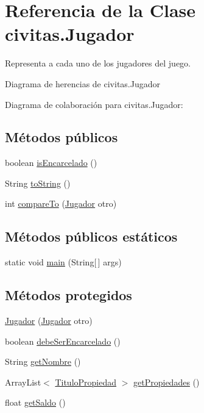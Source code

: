 \hypertarget{classcivitas_1_1Jugador}{}\section{Referencia de la Clase civitas.\+Jugador}
\label{classcivitas_1_1Jugador}


Representa a cada uno de los jugadores del juego.  




Diagrama de herencias de civitas.\+Jugador


Diagrama de colaboración para civitas.\+Jugador\+:
\subsection*{Métodos públicos}
\begin{DoxyCompactItemize}
\item 
boolean \hyperlink{classcivitas_1_1Jugador_a05547894205ba819363c25f40addecae}{is\+Encarcelado} ()
\item 
String \hyperlink{classcivitas_1_1Jugador_a102b4070dfc271c865fcd6ebe92d9c06}{to\+String} ()
\item 
int \hyperlink{classcivitas_1_1Jugador_ad18fdf2b46d7146b458a77a919d66b58}{compare\+To} (\hyperlink{classcivitas_1_1Jugador}{Jugador} otro)
\end{DoxyCompactItemize}
\subsection*{Métodos públicos estáticos}
\begin{DoxyCompactItemize}
\item 
static void \hyperlink{classcivitas_1_1Jugador_a5ffd1393041fb0afa52d8d4a9572cdf2}{main} (String\mbox{[}$\,$\mbox{]} args)
\end{DoxyCompactItemize}
\subsection*{Métodos protegidos}
\begin{DoxyCompactItemize}
\item 
\hyperlink{classcivitas_1_1Jugador_ab6d7fb12843896b100653b7ad9d9bab8}{Jugador} (\hyperlink{classcivitas_1_1Jugador}{Jugador} otro)
\item 
boolean \hyperlink{classcivitas_1_1Jugador_af79b45017fa40c343ea072a30e9578d4}{debe\+Ser\+Encarcelado} ()
\item 
String \hyperlink{classcivitas_1_1Jugador_a798c1fffaaf1dd8d12f36dd3d09b4f1b}{get\+Nombre} ()
\item 
Array\+List$<$ \hyperlink{classcivitas_1_1TituloPropiedad}{Titulo\+Propiedad} $>$ \hyperlink{classcivitas_1_1Jugador_a2927df4695696abd841c71f6c3eba318}{get\+Propiedades} ()
\item 
float \hyperlink{classcivitas_1_1Jugador_a3c9d02f7974457585c0e2a58ccad6c76}{get\+Saldo} ()
\end{DoxyCompactItemize}
